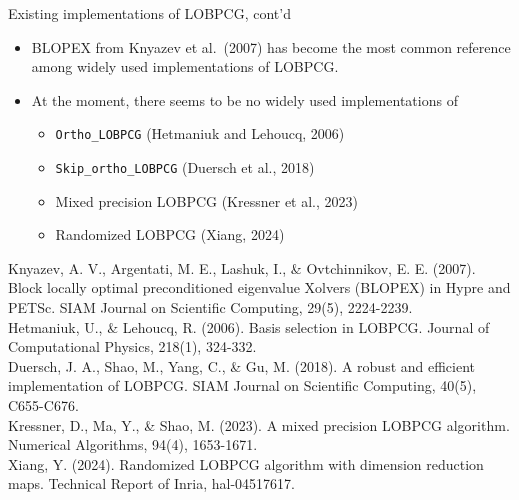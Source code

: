 \documentclass[t,usepdftitle=false]{beamer}
\begin{document}
\begin{frame}{Existing implementations of LOBPCG, cont'd}
	\begin{itemize}
		\item BLOPEX from Knyazev et al.~(2007) has become the most common reference among widely used implementations of LOBPCG.
		\item At the moment, there seems to be no widely used implementations of 
		\begin{itemize}
			\item \texttt{Ortho\_LOBPCG} (Hetmaniuk and Lehoucq, 2006)\tinyskip
			\item \texttt{Skip\_ortho\_LOBPCG} (Duersch et al., 2018)\tinyskip
			\item Mixed precision LOBPCG (Kressner et al., 2023)\tinyskip
			\item Randomized LOBPCG (Xiang, 2024)
		\end{itemize}
	\end{itemize}
	\medskip
	\tiny{Knyazev, A. V., Argentati, M. E., Lashuk, I., \& Ovtchinnikov, E. E. (2007). Block locally optimal preconditioned eigenvalue Xolvers (BLOPEX) in Hypre and PETSc. SIAM Journal on Scientific Computing, 29(5), 2224-2239.}\tinyskip\\	
	\tiny{Hetmaniuk, U., \& Lehoucq, R. (2006). Basis selection in LOBPCG. Journal of Computational Physics, 218(1), 324-332.}\tinyskip\\
	\tiny{Duersch, J. A., Shao, M., Yang, C., \& Gu, M. (2018). A robust and efficient implementation of LOBPCG. SIAM Journal on Scientific Computing, 40(5), C655-C676.}\tinyskip\\
	\tiny{Kressner, D., Ma, Y., \& Shao, M. (2023). A mixed precision LOBPCG algorithm. Numerical Algorithms, 94(4), 1653-1671.}\tinyskip\\
	\tiny{Xiang, Y. (2024). Randomized LOBPCG algorithm with dimension reduction maps. Technical Report of Inria, hal-04517617.}
\end{frame}	
\end{document}
